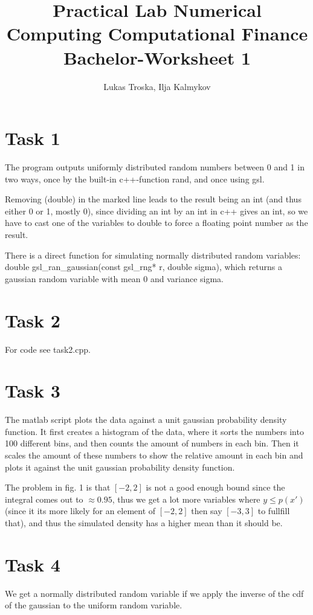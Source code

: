 \documentclass[]{article}
\title{Practical Lab Numerical Computing Computational Finance \\Bachelor-Worksheet 1}
\author{Lukas Troska, Ilja Kalmykov}
\date{}
\begin{document}
\maketitle \section*{Task 1} The program outputs uniformly distributed random
numbers between 0 and 1 in two ways, once by the built-in c++-function rand, and
once using gsl.

Removing (double) in the marked line leads to the result being an int (and thus
either 0 or 1, mostly 0), since dividing an int by an int in c++ gives an int,
so we have to cast one of the variables to double to force a floating point
number as the result.

There is a direct function for simulating normally distributed random variables:
double gsl\_ran\_gaussian(const gsl\_rng* r, double sigma), which returns a
gaussian random variable with mean 0 and variance sigma.

\section*{Task 2}
For code see task2.cpp.

\section*{Task 3} The matlab script plots the data against a unit gaussian
probability density function. It first creates a histogram of the data, where it
sorts the numbers into 100 different bins, and then counts the amount of numbers
in each bin. Then it scales the amount of these numbers to show the relative
amount in each bin and plots it against the unit gaussian probability density
function.

The problem in fig. 1 is that $[-2,2]$ is not a good enough bound since the
integral comes out to $\approx 0.95$, thus we get a lot more variables where
$y\le p(x')$ (since it its more likely for an element of $[-2,2]$ then say
$[-3,3]$ to fullfill that), and thus the simulated density has a higher mean
than it should be.

\section*{Task 4} We get a normally distributed random variable if we apply the
inverse of the cdf of the gaussian to the uniform random variable.
\end{document}

